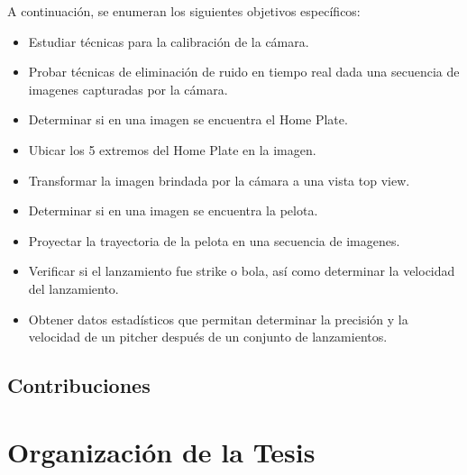 A continuación, se enumeran los siguientes objetivos específicos:
\begin{itemize}
    \item {Estudiar técnicas para la calibración de la cámara.}
    \item {Probar técnicas de eliminación de ruido en tiempo real dada una secuencia de imagenes capturadas por la cámara.}
    \item {Determinar si en una imagen se encuentra el Home Plate.}
    \item {Ubicar los 5 extremos del Home Plate en la imagen.}
    \item {Transformar la imagen brindada por la cámara a una vista top view.}
    \item {Determinar si en una imagen se encuentra la pelota.}
    \item {Proyectar la trayectoria de la pelota en una secuencia de imagenes.}
    \item {Verificar si el lanzamiento fue strike o bola, así como determinar la velocidad del lanzamiento.}
    \item {Obtener datos estadísticos que permitan determinar la precisión y la velocidad de un pitcher después de un conjunto de lanzamientos.}
\end{itemize}

\subsection*{Contribuciones}

\section*{Organización de la Tesis}

